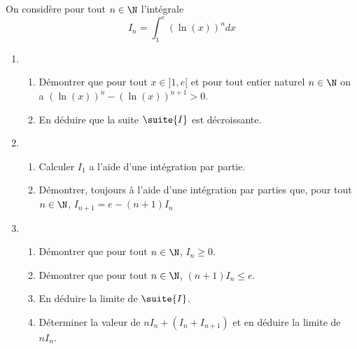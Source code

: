 


\begin{exercice}
On considère pour tout $n\in \N$ l'intégrale 
$$I_n = \int_1^e (\ln(x))^n dx$$

\begin{enumerate}
\item \begin{enumerate}
\item Démontrer que pour tout $x\in ]1,e[ $ et pour tout entier naturel $n\in \N$ on  a $ (\ln(x))^n  - (\ln(x))^{n+1} >0$.
\item En déduire que la suite $\suite{I}$ est décroissante.
\end{enumerate}
\item \begin{enumerate}
\item Calculer $I_1$ a l'aide d'une intégration par partie. 
\item Démontrer, toujours à l'aide d'une intégration par parties que, pour tout $n\in \N$, $I_{n+1} = e- (n+1)I_n$
\end{enumerate}
\item \begin{enumerate}
\item Démontrer que pour tout $n\in \N$, $I_n\geq0$.
\item Démontrer que pour tout $n\in \N$, $(n+1) I_n\leq e$.
\item En déduire la limite de $\suite{I}$. 
\item Déterminer la valeur de $nI_n +(I_n+I_{n+1})$  et en déduire la limite de $nI_n$. 
\end{enumerate}
\end{enumerate}
\end{exercice}

